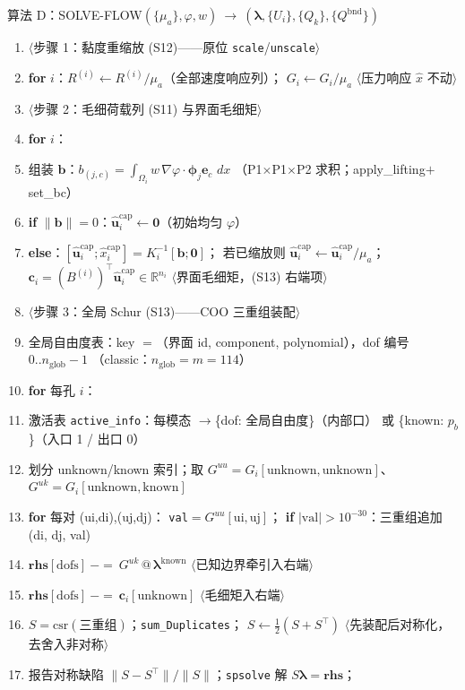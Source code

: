 \documentclass[11pt]{article}
\newcommand{\code}[1]{\texttt{#1}}
\newcommand{\dd}{\,dx}
\newcommand{\iu}{\hat{\bm u}}
\newcommand{\kwd}[1]{\textbf{#1}}
\newcommand{\cmt}[1]{{\color{cmtclr}$\langle$#1$\rangle$}}
\newcommand{\ind}{\hspace*{1.5em}}
\newenvironment{pseudo}[1]{\begin{algobox}{#1}%
  \begin{enumerate}[label={\ttfamily\arabic*}, leftmargin=3.4em, itemsep=1.5pt, topsep=1pt, parsep=0pt]}%
  {\end{enumerate}\end{algobox}}
\begin{document}
\begin{pseudo}{算法 D：SOLVE-FLOW$(\{\mu_a\},\varphi,w)\ \to\ (\bm\lambda,\{U_i\},\{Q_k\},\{Q^{\mathrm{bnd}}\})$}
\item[] \cmt{步骤 1：黏度重缩放 (S12)——原位 \code{scale}/\code{unscale}}
\item \kwd{for} $i$：$R^{(i)}\leftarrow R^{(i)}/\mu_a$（全部速度响应列）；
$G_i\leftarrow G_i/\mu_a$ \cmt{压力响应 $\hat x$ 不动}
\item[] \cmt{步骤 2：毛细荷载列 (S11) 与界面毛细矩}
\item \kwd{for} $i$：
\item \ind 组装 $\bm b$：$b_{(j,c)}=\int_{\Omega_i}w\,\nabla\varphi\cdot\bm\phi_j\bm e_c\,\dd$
（P1$\times$P1$\times$P2 求积；apply\_lifting$+$set\_bc）
\item \ind \kwd{if} $\|\bm b\|=0$：$\iu^{\mathrm{cap}}_i\leftarrow\bm0$（初始均匀 $\varphi$）
\item \ind \kwd{else}：$[\iu^{\mathrm{cap}}_i;\hat x^{\mathrm{cap}}_i]=K_i^{-1}[\bm b;\bm 0]$；
若已缩放则 $\iu^{\mathrm{cap}}_i\leftarrow\iu^{\mathrm{cap}}_i/\mu_a$；
$\bm c_i=(B^{(i)})^{\!\top}\iu^{\mathrm{cap}}_i\in\mathbb R^{n_i}$
\cmt{界面毛细矩，(S13) 右端项}
\item[] \cmt{步骤 3：全局 Schur (S13)——COO 三重组装配}
\item 全局自由度表：key $=$（界面 id, component, polynomial），dof 编号 $0..n_{\mathrm{glob}}-1$
（classic：$n_{\mathrm{glob}}=m=114$）
\item \kwd{for} 每孔 $i$：
\item \ind 激活表 \code{active\_info}：每模态 $\to$\{dof: 全局自由度\}（内部口）
或 \{known: $p_b$\}（入口 1 / 出口 0）
\item \ind 划分 unknown/known 索引；取 $G^{uu}=G_i[\text{unknown},\text{unknown}]$、
$G^{uk}=G_i[\text{unknown},\text{known}]$
\item \ind \kwd{for} 每对 (ui,di),(uj,dj)：
\code{val}$=G^{uu}[\mathrm{ui},\mathrm{uj}]$；
\kwd{if} $|\mathrm{val}|>10^{-30}$：三重组追加 (di, dj, val)
\item \ind $\bm{rhs}[\mathrm{dofs}]\ {-}{=}\ G^{uk}\,@\,\bm\lambda^{\mathrm{known}}$
\cmt{已知边界牵引入右端}
\item \ind $\bm{rhs}[\mathrm{dofs}]\ {-}{=}\ \bm c_i[\text{unknown}]$
\cmt{毛细矩入右端}
\item $S=\mathrm{csr}(\text{三重组})$；\code{sum\_Duplicates}；
$S\leftarrow\tfrac12(S+S^{\!\top})$ \cmt{先装配后对称化，去舍入非对称}
\item 报告对称缺陷 $\|S-S^{\!\top}\|/\|S\|$；\code{spsolve} 解 $S\bm\lambda=\bm{rhs}$；

\end{pseudo}
\end{document}
